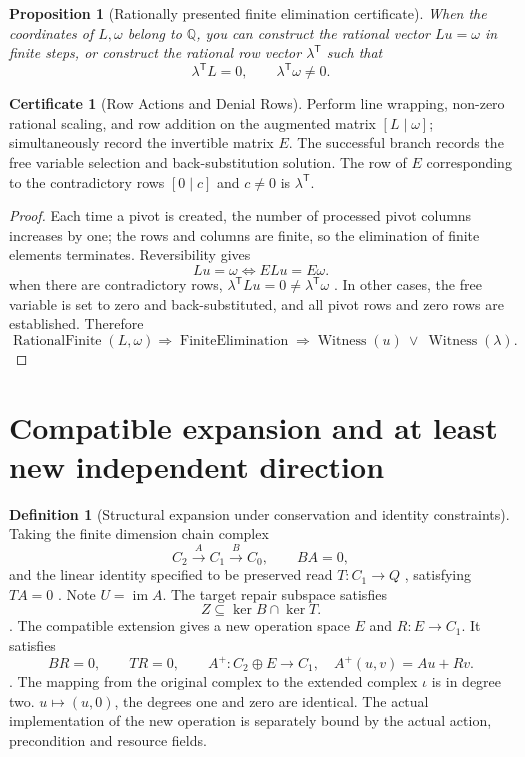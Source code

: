 \documentclass[12pt,a4paper,openany,notitlepage]{report}
\theoremstyle{plain}
\newtheorem{proposition}[theorem]{Proposition}
\theoremstyle{definition}
\newtheorem{definition}[theorem]{Definition}
\newtheorem*{certificate}{Certificate}
\theoremstyle{remark}
\begin{document}
\begin{CJK*}
\begin{proposition}
[Rationally presented finite elimination certificate]\label{hgov:prop-elimination}
When the coordinates of $L,\omega$ belong to $\mathbb Q$, you can construct the rational vector $Lu=\omega$ in finite steps, or construct the rational row vector $\lambda^{\mathsf T}$ such that \[
 \lambda^{\mathsf T}L=0,\qquad
 \lambda^{\mathsf T}\omega\ne0.
\]\end{proposition}
\begin{certificate}
[Row Actions and Denial Rows]Perform line wrapping, non-zero rational scaling, and row addition on the augmented matrix $[L\mid\omega]$; simultaneously record the invertible matrix $E$. The successful branch records the free variable selection and back-substitution solution. The row of $E$ corresponding to the contradictory rows $[0\mid c]$ and $c\ne0$ is $\lambda^{\mathsf T}$.\end{certificate}
\begin{proof}
Each time a pivot is created, the number of processed pivot columns increases by one; the rows and columns are finite, so the elimination of finite elements terminates. Reversibility gives \[
 Lu=\omega\Longleftrightarrow ELu=E\omega.
\] when there are contradictory rows, $\lambda^{\mathsf T}Lu=0\ne\lambda^{\mathsf T}\omega$ . In other cases, the free variable is set to zero and back-substituted, and all pivot rows and zero rows are established. Therefore \[
 \operatorname{RationalFinite}(L,\omega)
 \Longrightarrow
 \operatorname{FiniteElimination}
 \Longrightarrow
 \operatorname{Witness}(u)\ \vee\ \operatorname{Witness}(\lambda).
\]\end{proof}


\section { Compatible expansion and at least new independent direction }\label{hgov:compatible-extension}


\begin{definition}
[Structural expansion under conservation and identity constraints]\label{hgov:def-extension}
Taking the finite dimension chain complex \[
 C_2\xrightarrow{A}C_1\xrightarrow{B}C_0,\qquad BA=0,
\] and the linear identity specified to be preserved read $T:C_1\to Q$ , satisfying $TA=0$ . Note $U=\operatorname{im}A$. The target repair subspace satisfies \[
 Z\subseteq\ker B\cap\ker T.
\]. The compatible extension gives a new operation space $E$ and $R:E\to C_1$. It satisfies \[
 BR=0,\qquad TR=0,\qquad
 A^+:C_2\oplus E\longrightarrow C_1,\quad A^+(u,v)=Au+Rv.
\]. The mapping from the original complex to the extended complex $\iota$ is in degree two. $u\mapsto(u,0)$, the degrees one and zero are identical. The actual implementation of the new operation is separately bound by the actual action, precondition and resource fields.\end{definition}



\end{CJK*}
\end{document}
